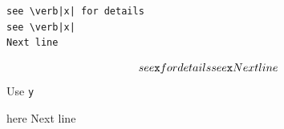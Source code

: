 \begin{verbatim}
see \verb|x| for details
see \verb|x|
Next line
\end{verbatim}

\[
see \verb|x| for details
see \verb|x|
Next line
\]
Use \verb|y|

here
Next line
